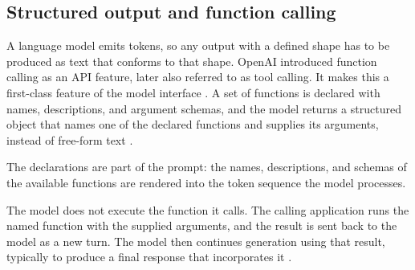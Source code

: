 \subsection{Structured output and function calling}
\label{sec:structured-output}

A language model emits tokens, so any output with a defined shape has to be produced as text that conforms to that shape. OpenAI introduced function calling as an API feature, later also referred to as tool calling. It makes this a first-class feature of the model interface \cite{FunctionCallingOther2024}. A set of functions is declared with names, descriptions, and argument schemas, and the model returns a structured object that names one of the declared functions and supplies its arguments, instead of free-form text \cite{FunctionCallingOther2024}.

The declarations are part of the prompt: the names, descriptions, and schemas of the available functions are rendered into the token sequence the model processes.

The model does not execute the function it calls. The calling application runs the named function with the supplied arguments, and the result is sent back to the model as a new turn. The model then continues generation using that result, typically to produce a final response that incorporates it \cite{FunctionCallingOther2024}.
